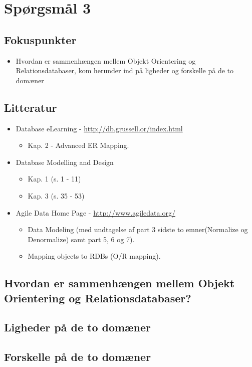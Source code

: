 \section{Spørgsmål 3}

\subsection{Fokuspunkter}
\begin{itemize}
	\item Hvordan er sammenhængen mellem Objekt Orientering og Relationsdatabaser, kom herunder ind på ligheder og forskelle på de to domæner
\end{itemize}

\subsection{Litteratur}
\begin{itemize}
	\item Database eLearning - \url{http://db.grussell.or/index.html}
	\begin{itemize}
		\item Kap. 2 - Advanced ER Mapping.
	\end{itemize}
	\item Database Modelling and Design
	\begin{itemize}
		\item Kap. 1 (s. 1 - 11)
		\item Kap. 3 (s. 35 - 53)
	\end{itemize}
	\item Agile Data Home Page - \url{http://www.agiledata.org/}
	\begin{itemize}
		\item Data Modeling (med undtagelse af part 3 sidste to emner(Normalize og Denormalize) samt part 5, 6 og 7).
		\item Mapping objects to RDBs (O/R mapping).
	\end{itemize}
\end{itemize}

\newpage

\subsection{Hvordan er sammenhængen mellem Objekt Orientering og Relationsdatabaser?}

\subsection{Ligheder på de to domæner}

\subsection{Forskelle på de to domæner}